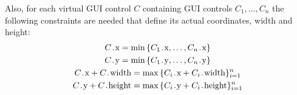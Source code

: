 \begin{comment}
The set of layout primitives defines a set of integer constraints as follows.

\begin{itemize}
\item A primitive $\term{hor}\,(C_1,\,C_2)$ introduces constraints

\vspace{-1em}
  \begin{gather*}
    C_2\prg{.x} - C_1\prg{.x} \leq i_H + C_1{.width}\\
    C_2\prg{.y} - C_1\prg{.y} = a_V
  \end{gather*}

\item A primitive $\term{vert}\,(C_1,\,C_2)$ introduces constraints

\vspace{-1em}
  \begin{gather*}
    C_2\prg{.x} - C_1\prg{.x} = a_H\\
    C_2\prg{.y} - C_1\prg{.y} \leq i_V + C_1\prg{.height}
  \end{gather*}

\item A primitive $\term{halign}\,(C_1,\,C_2)$ introduces a constraint
  \[
  C_1\prg{.x} - C_2\prg{.x} = a_H
  \]

\item A primitive  $\term{valign}\,(C_1,\,C_2)$ introduces a constraint
  \[
  C_1\prg{.y} - C_2\prg{.y} = a_V
  \]

\item A primitive $\term{indent}\,(C_1,\,C_2)$ introduces constraints
  \begin{gather*}
    C_1\prg{.x} - C_2\prg{.x} = ind\\
    C_1\prg{.y} - C_2\prg{.y} \leq i_V + C_1\prg{.height}
  \end{gather*}
\end{itemize}

\end{comment}

Also, for each virtual GUI control $C$ containing GUI controls $C_1, \ldots, C_n$ the following constraints are needed that define
its actual coordinates, width and height:
  \begin{gather*}
    C\prg{.x} = \min\,\{C_1\prg{.x}, \ldots, C_n\prg{.x}\}\\
    C\prg{.y} = \min\,\{C_1\prg{.y}, \ldots, C_n\prg{.y}\}\\
    C\prg{.x} + C\prg{.width} = \max\,\{C_i\prg{.x} + C_i\prg{.width}\}_{i=1}^n\\
    C\prg{.y} + C\prg{.height} = \max\,\{C_i\prg{.y} + C_i\prg{.height}\}_{i=1}^n\\
  \end{gather*}

